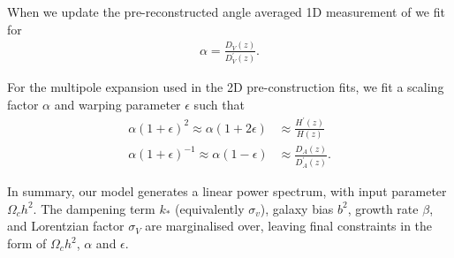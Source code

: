 \documentclass[iop,twocolappendix]{emulateapj}
\begin{document}
When we update the pre-reconstructed angle averaged 1D measurement of \citet{BlakeKazin2011} we fit for 
\begin{align}
\alpha = \frac{D_V(z)}{D_V^{\prime}(z) }.\label{eq:DvDv}
\end{align}

For the multipole expansion used in the 2D pre-construction fits, we fit a scaling factor $\alpha$ and warping parameter $\epsilon$ such that
\begin{align}
\alpha(1 + \epsilon)^2 \approx \alpha(1 + 2\epsilon) &\approx \frac{H^\prime(z)}{H(z)} \label{eq:alpha1}\\
\alpha(1 + \epsilon)^{-1} \approx \alpha(1 - \epsilon) &\approx \frac{D_A(z)}{D_A^\prime(z) }. \label{eq:alpha2}
\end{align}










In summary, our model generates a linear power spectrum, with input parameter $\Omega_c h^2$. The dampening term $k_*$ (equivalently $\sigma_v$), galaxy bias $b^2$, growth rate $\beta$, and Lorentzian factor $\sigma_V$ are marginalised over, leaving final constraints in the form of $\Omega_c h^2$, $\alpha$ and $\epsilon$. %
\end{document}
